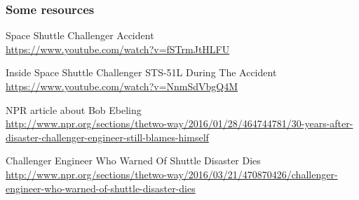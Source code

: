 \documentclass[12pt]{beamer}\usepackage[]{graphicx}\usepackage[]{color}
\begin{document}

\begin{frame}
\frametitle{}
\begin{center}
\end{center}
\end{frame}


\begin{frame}
\frametitle{}
\begin{center}
\end{center}
\end{frame}


\begin{frame}
\frametitle{}
\begin{center}
\end{center}
\end{frame}


\begin{frame}
\frametitle{Some resources}

\bi
  \item Space Shuttle Challenger Accident \\
  {\tiny \url{https://www.youtube.com/watch?v=fSTrmJtHLFU}}
  \item Inside Space Shuttle Challenger STS-51L During The Accident \\
  {\tiny \url{https://www.youtube.com/watch?v=NnmSdVbgQ4M}}
  \item NPR article about Bob Ebeling \\
  {\tiny \url{http://www.npr.org/sections/thetwo-way/2016/01/28/464744781/30-years-after-disaster-challenger-engineer-still-blames-himself}}
  \item Challenger Engineer Who Warned Of Shuttle Disaster Dies \\
  {\tiny \url{http://www.npr.org/sections/thetwo-way/2016/03/21/470870426/challenger-engineer-who-warned-of-shuttle-disaster-dies}}
\ei

\end{frame}

\end{document}
